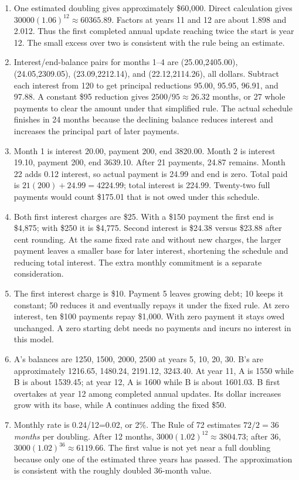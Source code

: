 \documentclass[11pt,letterpaper]{article}
\begin{document}
{\begin{enumerate}
\item One estimated doubling gives approximately \$60,000. Direct calculation gives $30000(1.06)^{12}\approx60365.89$. Factors at years 11 and 12 are about 1.898 and 2.012. Thus the first completed annual update reaching twice the start is year 12. The small excess over two is consistent with the rule being an estimate.
\item Interest/end-balance pairs for months 1--4 are (25.00,2405.00), (24.05,2309.05), (23.09,2212.14), and (22.12,2114.26), all dollars. Subtract each interest from 120 to get principal reductions 95.00, 95.95, 96.91, and 97.88. A constant \$95 reduction gives $2500/95\approx26.32$ months, or 27 whole payments to clear the amount under that simplified rule. The actual schedule finishes in 24 months because the declining balance reduces interest and increases the principal part of later payments.
\item Month 1 is interest 20.00, payment 200, end 3820.00. Month 2 is interest 19.10, payment 200, end 3639.10. After 21 payments, 24.87 remains. Month 22 adds 0.12 interest, so actual payment is 24.99 and end is zero. Total paid is $21(200)+24.99=4224.99$; total interest is 224.99. Twenty-two full payments would count \$175.01 that is not owed under this schedule.
\newpage
\item Both first interest charges are \$25. With a \$150 payment the first end is \$4,875; with \$250 it is \$4,775. Second interest is \$24.38 versus \$23.88 after cent rounding. At the same fixed rate and without new charges, the larger payment leaves a smaller base for later interest, shortening the schedule and reducing total interest. The extra monthly commitment is a separate consideration.
\item The first interest charge is \$10. Payment 5 leaves growing debt; 10 keeps it constant; 50 reduces it and eventually repays it under the fixed rule. At zero interest, ten \$100 payments repay \$1,000. With zero payment it stays owed unchanged. A zero starting debt needs no payments and incurs no interest in this model.
\item A's balances are 1250, 1500, 2000, 2500 at years 5, 10, 20, 30. B's are approximately 1216.65, 1480.24, 2191.12, 3243.40. At year 11, A is 1550 while B is about 1539.45; at year 12, A is 1600 while B is about 1601.03. B first overtakes at year 12 among completed annual updates. Its dollar increases grow with its base, while A continues adding the fixed \$50.
\item Monthly rate is 0.24/12=0.02, or 2\%. The Rule of 72 estimates $72/2=36$ \emph{months} per doubling. After 12 months, $3000(1.02)^{12}\approx3804.73$; after 36, $3000(1.02)^{36}\approx6119.66$. The first value is not yet near a full doubling because only one of the estimated three years has passed. The approximation is consistent with the roughly doubled 36-month value.

\end{enumerate}}
\end{document}
